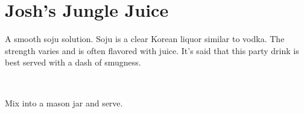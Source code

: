 \section[Jungle Juice]{Josh's Jungle Juice~}

\begin{recipestats}[
        servings=1,
        preptime=5~\minute,
        original=Josh \& Mr. Taylor,
    ]
\end{recipestats}

\begin{recipeabstract}
    A smooth soju solution.
    Soju is a clear Korean liquor similar to vodka.
    The strength varies and is often flavored with juice.
    It's said that this party drink is best served with a dash of smugness.
\end{recipeabstract}

\begin{ingredientcolumns}[1]
    \begin{ingredientblock}
        \\
    \end{ingredientblock}
\end{ingredientcolumns}

\begin{preparation}
\item Mix into a mason jar and serve.
\end{preparation}

\recipeend%
